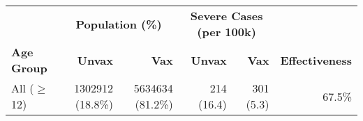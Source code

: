 \begin{table}[ht]
\centering
\begin{tabular}{lrrrrr}
  \toprule
  & \multicolumn{2}{c}{\textbf{Population (\%)}} & \multicolumn{2}{c}{\textbf{Severe Cases (per 100k\footnotemark{})}} & \\
 \cmidrule(lr){2-3} \cmidrule(lr){4-5}
 \textbf{Age Group} & \textbf{Unvax} & \textbf{Vax} & \textbf{Unvax} & \textbf{Vax} & \textbf{Effectiveness} \\
 \midrule
All ($\geq$12) & 1302912 (18.8\%) & 5634634 (81.2\%) & 214 (16.4) & 301 (5.3) & 67.5\% \\ 
   \bottomrule
\end{tabular}
\end{table}
